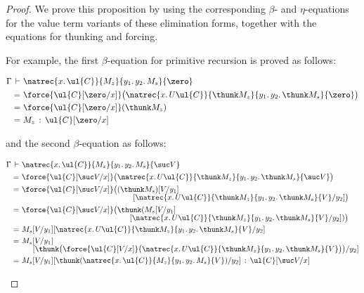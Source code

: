 \begin{proof}
We prove this proposition by using the corresponding $\beta$- and $\eta$-equations for the value term variants of these elimination forms, together with the equations for thunking and forcing. 

For example, the first $\beta$-equation for primitive recursion is proved as follows:
\begin{fleqn}[0.3cm]
\begin{align*}
\Gamma \,\vdash\,\, & \natrec {x.\,\ul{C}} {M_z} {y_1.\, y_2.\, M_s} {\zero}
\\
=\,\, & \force {\ul{C}[\zero/x]} \big(\natrec {x.\,U\ul{C}} {\thunk M_z} {y_1.\, y_2.\, \thunk M_s} {\zero}\big)
\\
=\,\, & \force {\ul{C}[\zero/x]} (\thunk M_z)
\\
=\,\, & M_z \,:\, \ul{C}[\zero/x]
\end{align*}
\end{fleqn}
%
and the second $\beta$-equation as follows:
\begin{fleqn}[0.1cm]
\begin{align*}
\Gamma \,\vdash\,\, & \natrec {x.\,\ul{C}} {M_z} {y_1.\, y_2.\, M_s} {\suc V}
\\
=\,\, & \force {\ul{C}[\suc V/x]} \big(\natrec {x.\,U\ul{C}} {\thunk M_z} {y_1.\, y_2.\, \thunk M_s} {\suc V}\big)
\\
=\,\, & \force {\ul{C}[\suc V/x]} \big((\thunk M_s)[V/y_1]
\\[-2mm]
& \hspace{5.08cm} [\natrec {x.\,U\ul{C}} {\thunk M_z} {y_1.\, y_2.\, \thunk M_s} {V}/y_2]\big)
\\
=\,\, & \force {\ul{C}[\suc V/x]} \big(\thunk (M_s[V/y_1]
\\[-2mm]
& \hspace{4.93cm} [\natrec {x.\,U\ul{C}} {\thunk M_z} {y_1.\, y_2.\, \thunk M_s} {V}/y_2])\big)
\\
=\,\, & M_s[V/y_1][\natrec {x.\,U\ul{C}} {\thunk M_z} {y_1.\, y_2.\, \thunk M_s} {V}/y_2]
\\
=\,\, & M_s[V/y_1]
\\[-2mm]
& \hspace{0.5cm} [\thunk \big(\force {\ul{C}[V/x]} \big(\natrec {x.\,U\ul{C}} {\thunk M_z} {y_1.\, y_2.\, \thunk M_s} {V}\big)\big)/y_2]
\\
=\,\, & M_s[V/y_1][\thunk (\natrec {x.\,\ul{C}} {M_z} {y_1.\, y_2.\, M_s} {V})/y_2] \,:\, \ul{C}[\suc V/x]
\end{align*}
\end{fleqn}
%


\end{proof}
